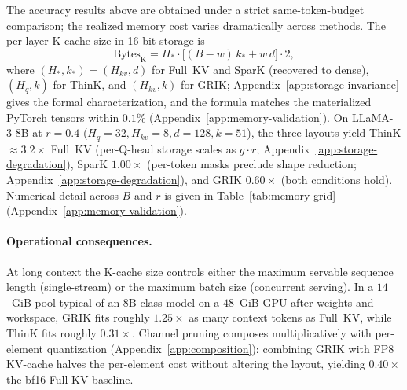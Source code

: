 \documentclass{article}
\begin{document}
The accuracy results above are obtained under a strict same-token-budget comparison; the realized memory cost varies dramatically across methods. The per-layer K-cache size in 16-bit storage is
\[
\text{Bytes}_{\text{K}} = H_{*} \cdot \big[(B-w)\,k_{*} + w\,d\big] \cdot 2,
\]
where $(H_{*}, k_{*}) = (H_{kv}, d)$ for Full~KV and SparK (recovered to dense), $(H_q, k)$ for ThinK, and $(H_{kv}, k)$ for GRIK; Appendix~\ref{app:storage-invariance} gives the formal characterization, and the formula matches the materialized PyTorch tensors within $0.1\%$ (Appendix~\ref{app:memory-validation}). On LLaMA-3-8B at $r{=}0.4$ ($H_q{=}32, H_{kv}{=}8, d{=}128, k{=}51$), the three layouts yield ThinK $\approx 3.2\times$ Full~KV (per-Q-head storage scales as $g \cdot r$; Appendix~\ref{app:storage-degradation}), SparK $1.00\times$ (per-token masks preclude shape reduction; Appendix~\ref{app:storage-degradation}), and GRIK $0.60\times$ (both conditions hold). Numerical detail across $B$ and $r$ is given in Table~\ref{tab:memory-grid} (Appendix~\ref{app:memory-validation}).




\paragraph{Operational consequences.} At long context the K-cache size controls either the maximum servable sequence length (single-stream) or the maximum batch size (concurrent serving). In a $14$~GiB pool typical of an 8B-class model on a $48$~GiB GPU after weights and workspace, GRIK fits roughly $1.25\times$ as many context tokens as Full~KV, while ThinK fits roughly $0.31\times$. Channel pruning composes multiplicatively with per-element quantization (Appendix~\ref{app:composition}): combining GRIK with FP8 KV-cache halves the per-element cost without altering the layout, yielding $0.40\times$ the bf16 Full-KV baseline.
 
 
\end{document}
